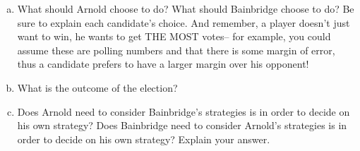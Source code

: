 \begin{xca}
\begin{enumerate}[(a)]
\item What should Arnold choose to do? What should Bainbridge choose to do? Be sure to explain each candidate's choice. And remember, a player doesn't just want to win, he wants to get THE MOST votes-- for example, you could assume these are polling numbers and that there is some margin of error, thus a candidate prefers to have a larger margin over his opponent!


\item What is the outcome of the election?
\item Does Arnold need to consider Bainbridge's strategies is in order to decide on his own strategy? Does Bainbridge need to consider Arnold's strategies is in order to decide on his own strategy? Explain your answer.

\end{enumerate}
\end{xca}

